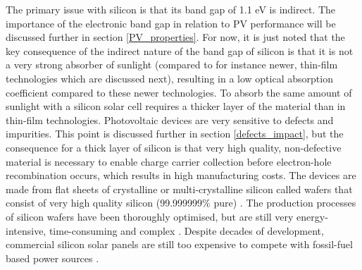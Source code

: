 \documentclass[11pt, twoside]{report}
\begin{document}
The primary issue with silicon is that its band gap of 1.1 eV is indirect. The importance of the electronic band gap in relation to PV performance will be discussed further in section \ref{PV_properties}. For now, it is just noted that the key consequence of the indirect nature of the band gap of silicon is that it is not a very strong absorber of sunlight (compared to for instance newer, thin-film technologies which are discussed next), resulting in a low optical absorption coefficient  compared to these newer technologies. To absorb the same amount of sunlight with a silicon solar cell requires a thicker layer of the material than in thin-film technologies. Photovoltaic devices are very sensitive to defects and impurities. This point is discussed further in section \ref{defects_impact}, but the consequence for a thick layer of silicon is that very high quality, non-defective material is necessary to enable charge carrier collection before electron-hole recombination occurs, which results in high manufacturing costs. The devices are made from flat sheets of crystalline or multi-crystalline silicon called wafers that consist of very high quality silicon (99.999999\% pure) 
\cite{sus_book_5}.
The production processes of silicon wafers have been thoroughly optimised, but are still very energy-intensive, time-consuming and complex \cite{emerging_pv}.
Despite decades of development, commercial silicon solar panels are still too expensive to compete with fossil-fuel based power sources \cite{FE_PV_rev1_5}. 

\end{document}
